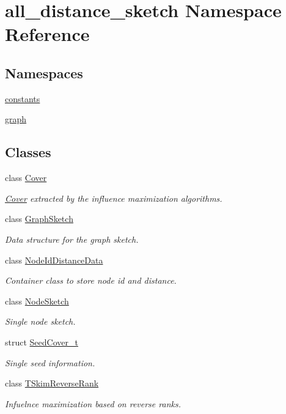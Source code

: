 \hypertarget{namespaceall__distance__sketch}{}\section{all\+\_\+distance\+\_\+sketch Namespace Reference}
\label{namespaceall__distance__sketch}
\subsection*{Namespaces}
\begin{DoxyCompactItemize}
\item 
 \hyperlink{namespaceall__distance__sketch_1_1constants}{constants}
\item 
 \hyperlink{namespaceall__distance__sketch_1_1graph}{graph}
\end{DoxyCompactItemize}
\subsection*{Classes}
\begin{DoxyCompactItemize}
\item 
class \hyperlink{classall__distance__sketch_1_1Cover}{Cover}
\begin{DoxyCompactList}\small\item\em \hyperlink{classall__distance__sketch_1_1Cover}{Cover} extracted by the influence maximization algorithms. \end{DoxyCompactList}\item 
class \hyperlink{classall__distance__sketch_1_1GraphSketch}{Graph\+Sketch}
\begin{DoxyCompactList}\small\item\em Data structure for the graph sketch. \end{DoxyCompactList}\item 
class \hyperlink{classall__distance__sketch_1_1NodeIdDistanceData}{Node\+Id\+Distance\+Data}
\begin{DoxyCompactList}\small\item\em Container class to store node id and distance. \end{DoxyCompactList}\item 
class \hyperlink{classall__distance__sketch_1_1NodeSketch}{Node\+Sketch}
\begin{DoxyCompactList}\small\item\em Single node sketch. \end{DoxyCompactList}\item 
struct \hyperlink{structall__distance__sketch_1_1SeedCover__t}{Seed\+Cover\+\_\+t}
\begin{DoxyCompactList}\small\item\em Single seed information. \end{DoxyCompactList}\item 
class \hyperlink{classall__distance__sketch_1_1TSkimReverseRank}{T\+Skim\+Reverse\+Rank}
\begin{DoxyCompactList}\small\item\em Infuelnce maximization based on reverse ranks. \end{DoxyCompactList}\end{DoxyCompactItemize}
